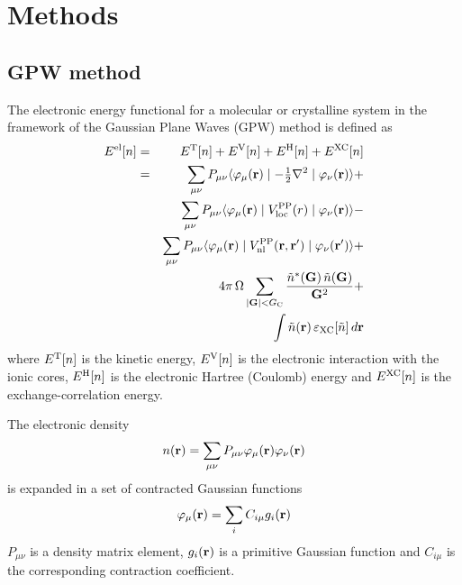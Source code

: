 \documentclass[12pt,twoside]{article}
\newcommand{\nn}{\nonumber}
\newcommand{\sfrac}[2]{\mbox{$\frac{#1}{#2}$}}
\begin{document}
\section{Methods}
%
\subsection{GPW method}
%
The electronic energy functional for a molecular or crystalline system in
the framework of the Gaussian Plane Waves (GPW) method is defined as
\cite{GPW}
\begin{eqnarray}
 \label{GPW-GTH-PP}
 E^{\rm el}[n] &=& E^{\rm T}[n] + E^{\rm V}[n] + E^{\rm H}[n] +
                   E^{\rm XC}[n] \nn \\
               &=& \sum_{\mu\nu} P_{\mu\nu}
                    \langle
                     \varphi_\mu({\bf r})
                     \mid -\sfrac{1}{2}\nabla^2 \mid
                     \varphi_\nu({\bf r})
                    \rangle + \nn \\
               & & \sum_{\mu\nu} P_{\mu\nu}
                    \langle
                     \varphi_\mu({\bf r})
                     \mid V_{\rm loc}^{\rm PP}(r) \mid
                     \varphi_\nu({\bf r})
                    \rangle -\\
               & & \sum_{\mu\nu} P_{\mu\nu}
                    \langle
                     \varphi_\mu({\bf r})
                     \mid V_{\rm nl}^{\rm PP}({\bf r},{\bf r}^\prime) \mid
                     \varphi_\nu({\bf r}^\prime)
                    \rangle + \nn \\
               & & 4\pi\,\Omega \sum_{|{\bf G}| < G_{\rm C}}
                    \frac{\tilde n^*({\bf G})\,
                          \tilde n({\bf G})}{{\bf G}^2} + \nn \\
               & & \int\tilde n({\bf r})\,\varepsilon_{\rm XC}[\tilde n]\,
                   d{\bf r}
\end{eqnarray}
where $E^{\rm T}[n]$ is the kinetic energy, $E^{\rm V}[n]$ is the electronic
interaction with the ionic cores, $E^{\rm H}[n]$ is the electronic Hartree
(Coulomb) energy and $E^{\rm XC}[n]$ is the exchange-correlation energy.

The electronic density
\[
 n({\bf r}) = \sum_{\mu\nu} P_{\mu\nu}\varphi_\mu({\bf r})\varphi_\nu({\bf r})
\]
is expanded in a set of contracted Gaussian functions
\[
 \varphi_\mu({\bf r}) = \sum_i C_{i\mu} g_i({\bf r})
\]
$P_{\mu\nu}$ is a density matrix element, $g_i({\bf r})$ is a primitive
Gaussian function and $C_{i\mu}$ is the corresponding contraction coefficient.
\end{document}
